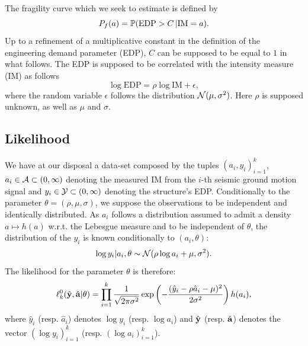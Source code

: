     The fragility curve which we seek to estimate is defined by
\begin{equation}
    P_f(a) = \mathbb{P}(\mathrm{EDP}>C\,|\mathrm{IM}=a).
\end{equation}
Up to a refinement of a multiplicative constant in the definition of the engineering demand parameter (EDP), $C$ can be supposed to be equal to $1$ in what follows.
The EDP is supposed to be correlated with the intensity measure (IM) as follows
\begin{equation}
    \log \mathrm{EDP} = \rho\log \mathrm{IM} + \epsilon ,
\end{equation}
where the random variable $\epsilon$ follows 
the distribution $\mathcal{N}(\mu,\sigma^2)$.
Here $\rho$ is supposed unknown, as well as $\mu$ and $\sigma$. 




    
    \subsection{Likelihood}\label{lowdoe:sec:likelihood}

We have at our disposal a data-set composed by the tuples $(a_i,y_i)_{i=1}^k$, $a_i\in\mathcal{A}\subset(0,\infty)$ denoting the measured IM from {the $i$-th seismic ground motion} signal and $y_i\in\mathcal{Y}\subset(0,\infty)$ denoting the structure's EDP. Conditionally to the parameter $\theta=(\rho,\mu,\sigma)$, we suppose the observations to be independent and identically distributed. As $a_i$ follows a distribution assumed to admit a density $a\mapsto h(a)$ w.r.t.{ }the Lebesgue measure and to be independent of $\theta$, the distribution of the $y_i$ is known conditionally to $(a_i,\theta)$:
    \begin{equation}
        \log y_i|a_i,\theta \sim \mathcal{N}(\rho\log a_i+\mu,\sigma^2)    .
    \end{equation}
The likelihood for the parameter $\theta$ is therefore:
    \begin{equation}
        \ell_k^0(\hat{\mathbf{y}},\hat{\mathbf{a}}|\theta) = \prod_{i=1}^k \frac{1}{\sqrt{2\pi\sigma^2}}\exp\left( -\frac{(\hat y_i-\rho\hat a_i-\mu)^2}{2\sigma^2} \right)h(a_i),
    \end{equation}
where $\hat y_i$ (resp. $\hat a_i$) denotes $\log y_i$ (resp. $\log a_i$) and $\hat{\mathbf{y}}$ (resp. $\hat{\mathbf{a}}$) denotes the vector $(\log y_i)_{i=1}^k$ (resp. $(\log a_i)_{i=1}^k$).

